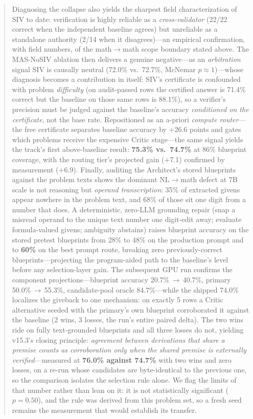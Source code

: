 \documentclass[11pt,a4paper]{article}
\begin{document}
\begin{abstract}
Diagnosing the collapse also yields the sharpest field characterization of SIV to date: verification is highly reliable as a \emph{cross-validator} (22/22 correct when the independent baseline agrees) but unreliable as a standalone authority (2/14 when it disagrees)---an empirical confirmation, with field numbers, of the math$\to$math scope boundary stated above.
The MAS-NoSIV ablation then delivers a genuine negative---as an \emph{arbitration} signal SIV is causally neutral (72.0\% vs.\ 72.7\%, McNemar $p{\approx}1$)---whose diagnosis becomes a contribution in itself: SIV's certificate is confounded with problem \emph{difficulty} (on audit-passed rows the certified answer is 71.4\% correct but the baseline on those same rows is 88.1\%), so a verifier's precision must be judged against the baseline's accuracy \emph{conditioned on the certificate}, not the base rate.
Repositioned as an a-priori \emph{compute router}---the free certificate separates baseline accuracy by +26.6 points and gates which problems receive the expensive Critic stage---the same signal yields the track's first above-baseline result: \textbf{75.3\% vs.\ 74.7\%} at 86\% blueprint coverage, with the routing tier's projected gain (+7.1) confirmed by measurement (+6.9).
Finally, auditing the Architect's stored blueprints against the problem texts shows the dominant NL$\to$math defect at 7B scale is not reasoning but \emph{operand transcription}: 35\% of extracted givens appear nowhere in the problem text, and 68\% of those sit one digit from a number that does.
A deterministic, zero-LLM grounding repair (snap a misread operand to the unique text number one digit-edit away; evaluate formula-valued givens; ambiguity abstains) raises blueprint accuracy on the stored pretest blueprints from 28\% to 48\% on the production prompt and to \textbf{60\%} on the best prompt route, breaking zero previously-correct blueprints---projecting the program-aided path to the baseline's level before any selection-layer gain.
The subsequent GPU run confirms the component projections---blueprint accuracy 20.7\%\,$\to$\,40.7\%, primary 50.0\%\,$\to$\,55.3\%, candidate-pool oracle 84.7\%---while the shipped 74.0\% localizes the giveback to one mechanism: on exactly 5 rows a Critic alternative seeded with the primary's own blueprint corroborated it against the baseline (2 wins, 3 losses, the run's entire paired delta).
The two wins ride on fully text-grounded blueprints and all three losses do not, yielding v15.3's closing principle: \emph{agreement between derivations that share a premise counts as corroboration only when the shared premise is externally verified}---measured at \textbf{76.0\% against 74.7\%} with two wins and zero losses, on a re-run whose candidates are byte-identical to the previous one, so the comparison isolates the selection rule alone. We flag the limits of that number rather than lean on it: it is not statistically significant ($p{=}0.50$), and the rule was derived from this problem set, so a fresh seed remains the measurement that would establish its transfer.
\end{abstract}
\end{document}
